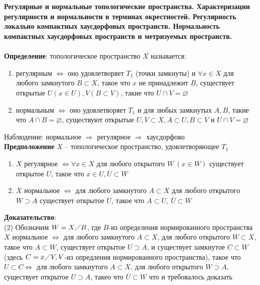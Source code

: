 \newpage
\section{}
	\textbf{Регулярные и нормальные топологические пространства. Характеризации регулярности и нормальности в терминах окрестностей. Регулярность локально компактных хаусдорфовых пространств. Нормальность компактных хаусдорфовых пространств и метризуемых пространств.}\\
	\\
	\textbf{Определение}: топологическое пространство $X$ называется:\\
	\begin{enumerate}
		\item 
		регулярным $\Leftrightarrow$ оно удовлетворяет $T_1$ (точки замкнуты) и $\forall x\in X$ для любого замкнутого $B \subset X$, такое что $x$ не принадлежит $B$, существует открытые $U(x\in U),V (B\subset V)$, такие что $U\cap V=\varnothing$
		\item 
		нормальным $\Leftrightarrow$ оно удовлетворяет $T_1$ и для любых замкнутых $A, B$, такие что $A \cap B=\varnothing$, существуют открытые $U, V\subset X, A\subset U, B\subset V$ и $U\cap V=\varnothing$
	\end{enumerate}
	Наблюдение: нормальное $\Rightarrow$ регулярное $\Rightarrow$ хаусдорфово\\
	\textbf{Предположение} $X$ -- топологическое  пространство, удовлетворяющее $T_1$\\
	\begin{enumerate}
		\item 
		$X$ регулярное $\Leftrightarrow \forall x\in X$ для любого открытого $W\ (x\in W)$ существует открытое $U$, такое что $x\in U, \overline{U} \subset W$
		\item 
		$X$ нормальное $\Leftrightarrow$ для любого замкнутого $A\subset X$ для любого открытого $W\supset A$ существует открытое $U$, такое что $A\subset U,\ \overline{U}\subset W$
	\end{enumerate}
	\textbf{Доказательство}: \\
	(2) Обозначим $W=X\diagup B$, где $B$-из определения нормированного пространства\\
	$X$ нормальное $\Leftrightarrow$ для любого замкнутого $A \subset X$, для любого открытого $W\subset X$, такое что $A\subset W$, существует открытое $U\supset A$, и существует замкнутое $C\subset W$(здесь $C=x\diagup V, V$-из опредления нормированного пространства), такое что $U\subset C \Leftrightarrow$ для любого замкнутого $A\subset X$, для любого открытого $W\supset A$, существует открытое $U \supset A$, такео что $\overline{U}\subset W$ что и требовалось доказать\\
